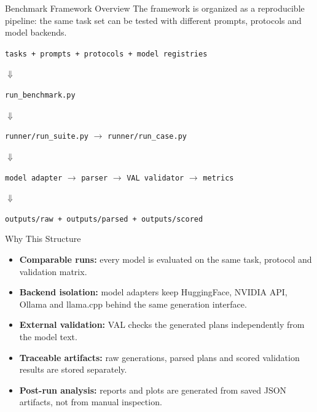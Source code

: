 \documentclass{beamer}
\begin{document}
\begin{frame}{Benchmark Framework Overview}\footnotesize
    The framework is organized as a reproducible pipeline: the same task set can be tested with different prompts, protocols and model backends.

    \vspace{0.35cm}
    \centering
    \texttt{tasks + prompts + protocols + model registries}

    \vspace{0.18cm}
    $\Downarrow$

    \vspace{0.18cm}
    \texttt{run\_benchmark.py}

    \vspace{0.18cm}
    $\Downarrow$

    \vspace{0.18cm}
    \texttt{runner/run\_suite.py} $\rightarrow$ \texttt{runner/run\_case.py}

    \vspace{0.18cm}
    $\Downarrow$

    \vspace{0.18cm}
    \texttt{model adapter} $\rightarrow$ \texttt{parser} $\rightarrow$ \texttt{VAL validator} $\rightarrow$ \texttt{metrics}

    \vspace{0.18cm}
    $\Downarrow$

    \vspace{0.18cm}
    \texttt{outputs/raw + outputs/parsed + outputs/scored}
\end{frame}

\begin{frame}{Why This Structure}\footnotesize
    \begin{itemize}
        \item \textbf{Comparable runs:} every model is evaluated on the same task, protocol and validation matrix.
        \item \textbf{Backend isolation:} model adapters keep HuggingFace, NVIDIA API, Ollama and llama.cpp behind the same generation interface.
        \item \textbf{External validation:} VAL checks the generated plans independently from the model text.
        \item \textbf{Traceable artifacts:} raw generations, parsed plans and scored validation results are stored separately.
        \item \textbf{Post-run analysis:} reports and plots are generated from saved JSON artifacts, not from manual inspection.
    \end{itemize}
\end{frame}
\end{document}
